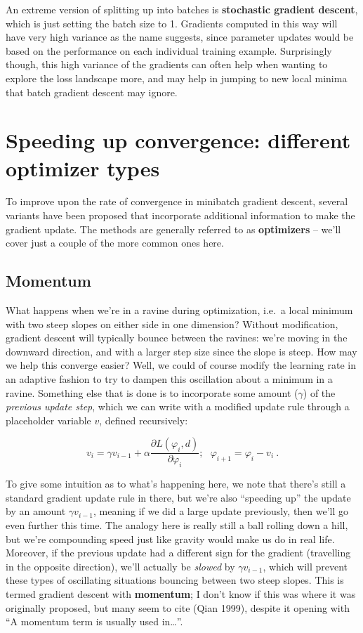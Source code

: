 \documentclass[
  11pt,
  numbers=noendperiod]{book}
\begin{document}
An extreme version of splitting up into batches is \textbf{stochastic
gradient descent}, which is just setting the batch size to 1. Gradients
computed in this way will have very high variance as the name suggests,
since parameter updates would be based on the performance on each
individual training example. Surprisingly though, this high variance of
the gradients can often help when wanting to explore the loss landscape
more, and may help in jumping to new local minima that batch gradient
descent may ignore.

\hypertarget{speeding-up-convergence-different-optimizer-types}{%
\section{Speeding up convergence: different optimizer
types}\label{speeding-up-convergence-different-optimizer-types}}

To improve upon the rate of convergence in minibatch gradient descent,
several variants have been proposed that incorporate additional
information to make the gradient update. The methods are generally
referred to as \textbf{optimizers} -- we'll cover just a couple of the
more common ones here.

\hypertarget{momentum}{%
\subsection{Momentum}\label{momentum}}

What happens when we're in a ravine during optimization, i.e.~a local
minimum with two steep slopes on either side in one dimension? Without
modification, gradient descent will typically bounce between the
ravines: we're moving in the downward direction, and with a larger step
size since the slope is steep. How may we help this converge easier?
Well, we could of course modify the learning rate in an adaptive fashion
to try to dampen this oscillation about a minimum in a ravine. Something
else that is done is to incorporate some amount (\(\gamma\)) of the
\emph{previous update step}, which we can write with a modified update
rule through a placeholder variable \(v\), defined recursively:

\[
v_{i} = \gamma v_{i-1} + \alpha \frac{\partial L(\varphi_i, d)}{\partial \varphi_i};~~~ \varphi_{i+1} = \varphi_i - v_i~.
\]

To give some intuition as to what's happening here, we note that there's
still a standard gradient update rule in there, but we're also
``speeding up'' the update by an amount \(\gamma v_{i-1}\), meaning if
we did a large update previously, then we'll go even further this time.
The analogy here is really still a ball rolling down a hill, but we're
compounding speed just like gravity would make us do in real life.
Moreover, if the previous update had a different sign for the gradient
(travelling in the opposite direction), we'll actually be \emph{slowed}
by \(\gamma v_{i-1}\), which will prevent these types of oscillating
situations bouncing between two steep slopes. This is termed gradient
descent with \textbf{momentum}; I don't know if this was where it was
originally proposed, but many seem to cite (Qian 1999), despite it
opening with ``A momentum term is usually used in\ldots{}''.
\end{document}
